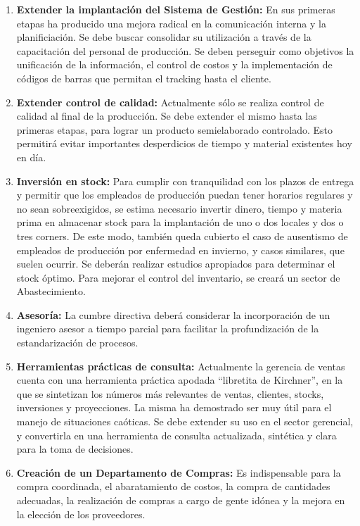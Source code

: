 \documentclass[a4paper,10pt,titlepage]{article}
\begin{document}
\begin{enumerate}
\item \textbf{Extender la implantaci\'on del Sistema de Gesti\'on:} En sus primeras etapas ha producido una mejora radical en la comunicaci\'on interna y la planificiaci\'on. Se debe buscar consolidar su utilizaci\'on a trav\'es de la capacitaci\'on del personal de producci\'on. Se deben perseguir como objetivos la unificaci\'on de la informaci\'on, el control de costos y la implementaci\'on de c\'odigos de barras que permitan el tracking hasta el cliente.

\item \textbf{Extender control de calidad:} Actualmente s\'olo se realiza control de calidad al final de la producci\'on. Se debe extender el mismo hasta las primeras etapas, para lograr un producto semielaborado controlado. Esto permitir\'a evitar importantes desperdicios de tiempo y material existentes hoy en d\'ia.

\item \textbf{Inversi\'on en stock:} Para cumplir con tranquilidad con los plazos de entrega y permitir que los empleados de producci\'on puedan tener horarios regulares y no sean sobreexigidos, se estima necesario invertir dinero, tiempo y materia prima en almacenar stock para la implantaci\'on de uno o dos locales y dos o tres corners. De este modo, tambi\'en queda cubierto el caso de ausentismo de empleados de producci\'on por enfermedad en invierno, y casos similares, que suelen ocurrir. Se deber\'an realizar estudios apropiados para determinar el stock \'optimo. Para mejorar el control del inventario, se crear\'a un sector de Abastecimiento.

\item \textbf{Asesor\'ia:} La cumbre directiva deber\'a considerar la incorporaci\'on de un ingeniero asesor a tiempo parcial para facilitar la profundizaci\'on de la estandarizaci\'on de procesos.

\item \textbf{Herramientas pr\'acticas de consulta:} Actualmente la gerencia de ventas cuenta con una herramienta pr\'actica apodada ``libretita de Kirchner'', en la que se sintetizan los n\'umeros m\'as relevantes de ventas, clientes, stocks, inversiones y proyecciones. La misma ha demostrado ser muy \'util para el manejo de situaciones ca\'oticas. Se debe extender su uso en el sector gerencial, y convertirla en una herramienta de consulta actualizada, sint\'etica y clara para la toma de decisiones.

\item \textbf{Creaci\'on de un Departamento de Compras:} Es indispensable para la compra coordinada, el abaratamiento de costos, la compra de cantidades adecuadas, la realizaci\'on de compras a cargo de gente id\'onea y la mejora en la elecci\'on de los proveedores.


\end{enumerate}
\end{document}

